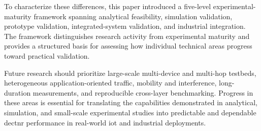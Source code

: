 \documentclass[conference]{IEEEtran}
\begin{document}
To characterize these differences, this paper introduced a five-level
experimental-maturity framework spanning analytical feasibility,
simulation validation, prototype validation, integrated-system
validation, and industrial integration. The framework distinguishes
research activity from experimental maturity and provides a structured
basis for assessing how individual technical areas progress toward
practical validation.

Future research should prioritize large-scale multi-device and
multi-hop testbeds, heterogeneous application-oriented traffic,
mobility and interference, long-duration measurements, and
reproducible cross-layer benchmarking. Progress in these areas is
essential for translating the capabilities demonstrated in analytical,
simulation, and small-scale experimental studies into predictable and
dependable \gls{dectnr} performance in real-world \gls{iot} and
industrial deployments.



\end{document}
